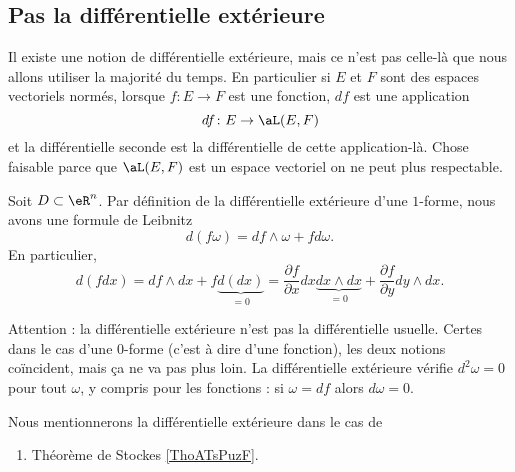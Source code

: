 \subsection{Pas la différentielle extérieure}

Il existe une notion de différentielle extérieure, mais ce n'est pas celle-là que nous allons utiliser la majorité du temps. En particulier si \( E\) et \( F\) sont des espaces vectoriels normés, lorsque \( f\colon E\to F\) est une fonction, \( df\) est une application
\begin{equation}
    df\colon E\to \aL(E,F)
\end{equation}
et la différentielle seconde est la différentielle de cette application-là. Chose faisable parce que \( \aL(E,F)\) est un espace vectoriel on ne peut plus respectable.

Soit $D\subset\eR^n$. Par définition de la différentielle extérieure d'une $1$-forme, nous avons une formule de Leibnitz
\begin{equation}
    d(f\omega)=df\wedge\omega+fd\omega.
\end{equation}
En particulier,
\begin{equation}
    d(fdx)=df\wedge dx+f\underbrace{d(dx)}_{=0}=\frac{ \partial f }{ \partial x }dx\underbrace{dx\wedge dx}_{=0}+\frac{ \partial f }{ \partial y }dy\wedge dx.
\end{equation}

Attention : la différentielle extérieure n'est pas la différentielle usuelle. Certes dans le cas d'une \( 0\)-forme (c'est à dire d'une fonction), les deux notions coïncident, mais ça ne va pas plus loin. La différentielle extérieure vérifie \( d^2\omega=0\) pour tout \( \omega\), y compris pour les fonctions : si \( \omega=df\) alors \( d\omega=0\).



Nous mentionnerons la différentielle extérieure dans le cas de
\begin{enumerate}
    \item
        Théorème de Stockes \ref{ThoATsPuzF}.
\end{enumerate}



